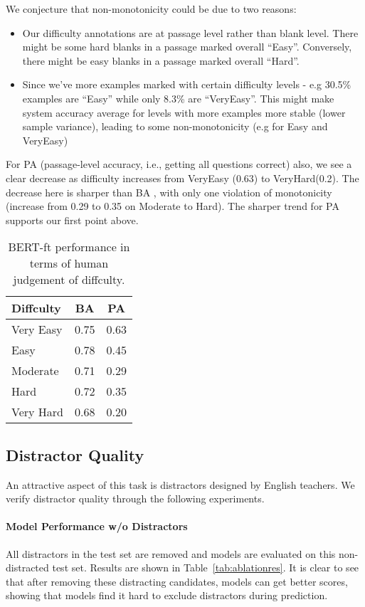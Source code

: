 \documentclass[11pt,a4paper]{article}
\begin{document}
We conjecture that non-monotonicity could be due to two reasons:
\begin{itemize}
    \item Our difficulty annotations are at passage level rather than blank level. There might be some hard blanks in a passage marked overall “Easy”. Conversely, there might be easy blanks in a passage marked overall “Hard”. 
    \item Since we’ve more examples marked with certain difficulty levels - e.g 30.5\% examples are “Easy” while only 8.3\% are “VeryEasy”. This might make system accuracy average for levels with more examples more stable (lower sample variance), leading to some non-monotonicity (e.g for Easy and VeryEasy)
\end{itemize}
For PA (passage-level accuracy, i.e., getting all questions correct) also, we see a clear decrease as difficulty increases from VeryEasy (0.63) to VeryHard(0.2). The decrease here is sharper than BA , with only one violation of monotonicity (increase from 0.29 to 0.35 on Moderate to Hard). The sharper trend for PA supports our first point above.

\begin{table}[!ht]
    \centering
    \begin{tabular}{l|c|c}
        \toprule
        Diffculty &  BA & PA\\
        \midrule
        Very Easy & 0.75 & 0.63 \\
        Easy & 0.78 & 0.45\\
        Moderate & 0.71 & 0.29\\
        Hard & 0.72 & 0.35\\
        Very Hard & 0.68 & 0.20\\
        \bottomrule
    \end{tabular}
    \caption{BERT-ft performance in terms of human judgement of diffculty.}
    \label{tab:diffculty_corr}
\end{table}
\subsection{Distractor Quality} \label{sec:discQuality}
An attractive aspect of this task is distractors designed by English teachers. We verify distractor quality through the following experiments.
\paragraph{Model Performance w/o Distractors} All distractors in the test set are removed and models are evaluated on this non-distracted test set. Results are shown in Table~\ref{tab:ablationres}. It is clear to see that after removing these distracting candidates, models can get better scores, showing that models find it hard to exclude distractors during prediction.
\end{document}
